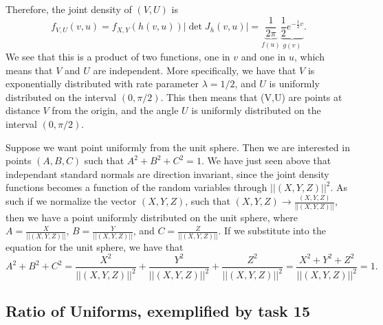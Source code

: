 \documentclass{article}
\theoremstyle{definition}
\theoremstyle{remark}
\begin{document}
Therefore, the joint density of $(V,U)$ is
\begin{equation}
    f_{V,U}(v,u) = f_{X,Y}(h(v,u)) \left| \det J_h(v,u) \right| =  \underbrace{\frac{1}{2\pi}}_{f(u)} \underbrace{\dfrac{1}{2}e^{-\frac{1}{2}v}}_{g(v)}.
\end{equation}
We see that this is a product of two functions, one in $v$ and one in $u$, which means that $V$ and $U$ are independent. More specifically, we have that $V$ is exponentially distributed with rate parameter $\lambda = 1/2$, and $U$ is uniformly distributed on the interval $(0, \pi/2)$. This then means that (V,U) are points at distance $V$ from the origin, and the angle $U$ is uniformly distributed on the interval $(0, \pi/2)$. \vspace{2em}

Suppose we want point uniformly from the unit sphere. Then we are interested in points $(A,B,C)$ such that $A^2 + B^2 + C^2 = 1$. We have just seen above that independant standard normals are direction invariant, since the joint density functions becomes a function of the random variables through $||(X,Y,Z)||^2$. As such if we normalize the vector $(X,Y,Z)$, such that $(X,Y,Z) \to \frac{(X,Y,Z)}{||(X,Y,Z)||}$, then we have a point uniformly distributed on the unit sphere, where $A = \frac{X}{||(X,Y,Z)||}$, $B = \frac{Y}{||(X,Y,Z)||}$, and $C = \frac{Z}{||(X,Y,Z)||}$. If we substitute into the equation for the unit sphere, we have that
\begin{equation}
    A^2 + B^2 + C^2 = \frac{X^2}{||(X,Y,Z)||^2} + \frac{Y^2}{||(X,Y,Z)||^2} + \frac{Z^2}{||(X,Y,Z)||^2} = \frac{X^2 + Y^2 + Z^2}{||(X,Y,Z)||^2} = 1.
\end{equation}

\subsection{Ratio of Uniforms, exemplified by task 15}
\end{document}
